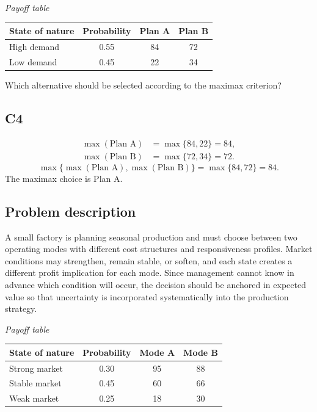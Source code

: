 \begin{ExamProblems}
		\begin{center}
			\textit{Payoff table} \par
			\begin{tabular}{l c c c}
				\toprule
				State of nature & Probability & Plan A & Plan B \\
				\midrule
				High demand & 0.55 & 84 & 72 \\
				Low demand & 0.45 & 22 & 34 \\
				\bottomrule
			\end{tabular}
		\end{center}

		Which alternative should be selected according to the maximax criterion?

		\subsection*{C4}
		\[
		\begin{aligned}
		\max(\text{Plan A}) &= \max\{84,22\} = 84,\\
		\max(\text{Plan B}) &= \max\{72,34\} = 72.
		\end{aligned}
		\]
		\[
		\max\{\max(\text{Plan A}),\max(\text{Plan B})\}
		= \max\{84,72\}
		= 84.
		\]
		The maximax choice is Plan A.
		\item
		\subsection*{Problem description}
		A small factory is planning seasonal production and must choose between two operating modes with different cost structures and responsiveness profiles. Market conditions may strengthen, remain stable, or soften, and each state creates a different profit implication for each mode. Since management cannot know in advance which condition will occur, the decision should be anchored in expected value so that uncertainty is incorporated systematically into the production strategy.

		\begin{center}
			\textit{Payoff table} \par
			\begin{tabular}{l c c c}
				\toprule
				State of nature & Probability & Mode A & Mode B \\
				\midrule
				Strong market & 0.30 & 95 & 88 \\
				Stable market & 0.45 & 60 & 66 \\
				Weak market & 0.25 & 18 & 30 \\
				\bottomrule
			\end{tabular}
		\end{center}


\end{ExamProblems}
